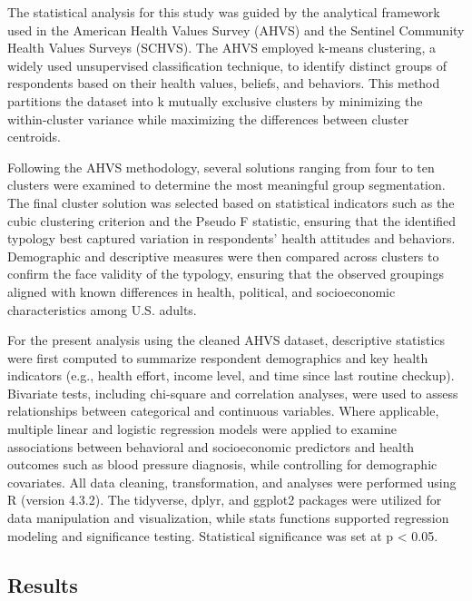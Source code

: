 \documentclass[
  letterpaper,
  DIV=11,
  numbers=noendperiod]{scrartcl}
\begin{document}
The statistical analysis for this study was guided by the analytical
framework used in the American Health Values Survey (AHVS) and the
Sentinel Community Health Values Surveys (SCHVS). The AHVS employed
k-means clustering, a widely used unsupervised classification technique,
to identify distinct groups of respondents based on their health values,
beliefs, and behaviors. This method partitions the dataset into k
mutually exclusive clusters by minimizing the within-cluster variance
while maximizing the differences between cluster centroids.

Following the AHVS methodology, several solutions ranging from four to
ten clusters were examined to determine the most meaningful group
segmentation. The final cluster solution was selected based on
statistical indicators such as the cubic clustering criterion and the
Pseudo F statistic, ensuring that the identified typology best captured
variation in respondents' health attitudes and behaviors. Demographic
and descriptive measures were then compared across clusters to confirm
the face validity of the typology, ensuring that the observed groupings
aligned with known differences in health, political, and socioeconomic
characteristics among U.S. adults.

For the present analysis using the cleaned AHVS dataset, descriptive
statistics were first computed to summarize respondent demographics and
key health indicators (e.g., health effort, income level, and time since
last routine checkup). Bivariate tests, including chi-square and
correlation analyses, were used to assess relationships between
categorical and continuous variables. Where applicable, multiple linear
and logistic regression models were applied to examine associations
between behavioral and socioeconomic predictors and health outcomes such
as blood pressure diagnosis, while controlling for demographic
covariates. All data cleaning, transformation, and analyses were
performed using R (version 4.3.2). The tidyverse, dplyr, and ggplot2
packages were utilized for data manipulation and visualization, while
stats functions supported regression modeling and significance testing.
Statistical significance was set at p \textless{} 0.05.

\subsection{Results}\label{sec-results}
\end{document}
